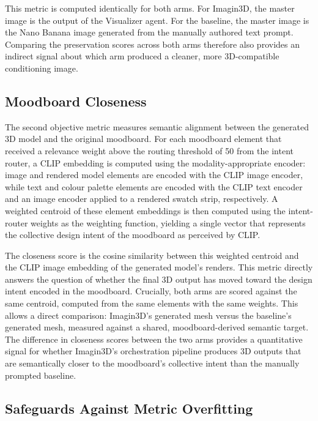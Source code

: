 This metric is computed identically for both arms. For Imagin3D, the master image is the output of the Visualizer agent. For the baseline, the master image is the Nano Banana image generated from the manually authored text prompt. Comparing the preservation scores across both arms therefore also provides an indirect signal about which arm produced a cleaner, more 3D-compatible conditioning image.

\subsection{Moodboard Closeness}

The second objective metric measures semantic alignment between the generated 3D model and the original moodboard. For each moodboard element that received a relevance weight above the routing threshold of 50 from the intent router, a CLIP embedding is computed using the modality-appropriate encoder: image and rendered model elements are encoded with the CLIP image encoder, while text and colour palette elements are encoded with the CLIP text encoder and an image encoder applied to a rendered swatch strip, respectively. A weighted centroid of these element embeddings is then computed using the intent-router weights as the weighting function, yielding a single vector that represents the collective design intent of the moodboard as perceived by CLIP.

The closeness score is the cosine similarity between this weighted centroid and the CLIP image embedding of the generated model's renders. This metric directly answers the question of whether the final 3D output has moved toward the design intent encoded in the moodboard. Crucially, both arms are scored against the same centroid, computed from the same elements with the same weights. This allows a direct comparison: Imagin3D's generated mesh versus the baseline's generated mesh, measured against a shared, moodboard-derived semantic target. The difference in closeness scores between the two arms provides a quantitative signal for whether Imagin3D's orchestration pipeline produces 3D outputs that are semantically closer to the moodboard's collective intent than the manually prompted baseline.

\subsection{Safeguards Against Metric Overfitting}

